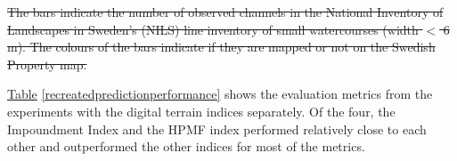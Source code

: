 \documentclass[11pt, review]{elsarticle} %
\providecommand{\DIFdeltex}[1]{{\protect\color{red}\sout{#1}}}                      %
\providecommand{\DIFdelbegin}{} %
\providecommand{\DIFdelend}{} %
\providecommand{\DIFdelFL}[1]{\DIFdel{#1}} %
\providecommand{\DIFdel}[1]{\texorpdfstring{\DIFdeltex{#1}}{}} %
\begin{document}
\DIFdelbegin %
{%
\DIFdelFL{The bars indicate the number of observed channels in the National Inventory of Landscapes in Sweden's (NILS) line inventory of small watercourses (width $<$ 6 m). The colours of the bars indicate if they are mapped or not on the Swedish Property map.}}

\DIFdelend \hyperref[recreatedpredictionperformance]{Table} \ref{recreatedpredictionperformance} shows the evaluation metrics from the experiments with the digital terrain indices separately. Of the four, the Impoundment Index and the HPMF index performed relatively close to each other and outperformed the other indices for most of the metrics.
\end{document}
